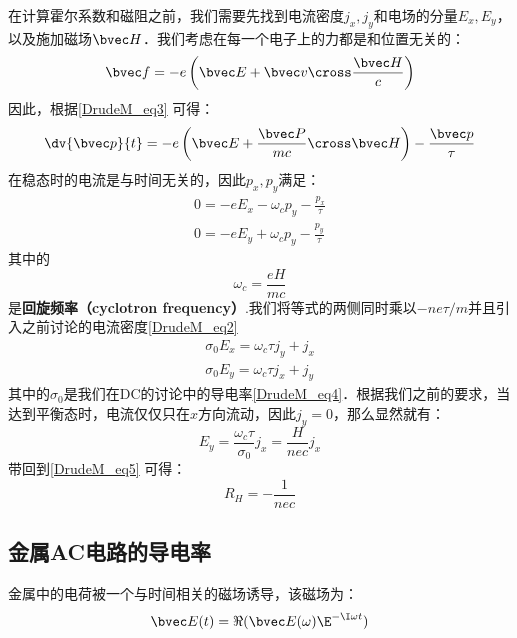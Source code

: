 在计算霍尔系数和磁阻之前，我们需要先找到电流密度$j_x,j_y$和电场的分量$E_x,E_y$，以及施加磁场$\bvec H$．我们考虑在每一个电子上的力都是和位置无关的：
\begin{equation}
\bvec f = -e\left(\bvec E +\bvec v\cross \frac{\bvec H}{c}\right)
\end{equation}
因此，根据\autoref{DrudeM_eq3} 可得：
\begin{equation}
\dv{\bvec p}{t}=-e\left(\bvec E +\frac{\bvec P}{mc}\cross \bvec H\right)-\frac{\bvec p}{\tau}
\end{equation}
在稳态时的电流是与时间无关的，因此$p_x,p_y$满足：
\begin{align}
0=-eE_x-\omega_c p_y -\frac{p_x}{\tau}\\
0=-eE_y+\omega_c p_y -\frac{p_y}{\tau}
\end{align}
其中的
\begin{equation}
\omega_c = \frac{eH}{mc}
\end{equation}
是\textbf{回旋频率（cyclotron frequency）}.我们将等式的两侧同时乘以$-ne\tau/m$并且引入之前讨论的电流密度\autoref{DrudeM_eq2} 
\begin{align}
\sigma_0 E_x = \omega_c \tau j_y+j_x\\
\sigma_0 E_y = \omega_c \tau j_x+j_y
\end{align}
其中的$\sigma_0$是我们在DC的讨论中的导电率\autoref{DrudeM_eq4}．根据我们之前的要求，当达到平衡态时，电流仅仅只在$x$方向流动，因此$j_y = 0$，那么显然就有：
\begin{equation}
 E_y = \frac{\omega_c \tau }{\sigma_0}j_x=\frac{H}{nec}j_x
\end{equation}
带回到\autoref{DrudeM_eq5} 可得：
\begin{equation}
R_H=-\frac{1}{nec}
\end{equation}

\subsection{金属AC电路的导电率}
金属中的电荷被一个与时间相关的磁场诱导，该磁场为：
\begin{equation}
\bvec E(t)=\Re(\bvec E(\omega)\E^{-\I\omega t})
\end{equation}

